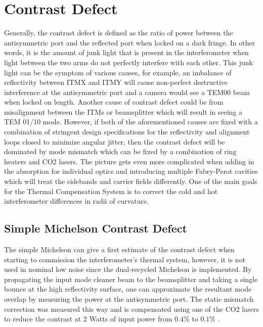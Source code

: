 	\section{Contrast Defect}
	Generally, the contrast defect is defined as the ratio of power between the antisymmetric port and the reflected port when locked on a dark fringe.  In other words, it is the amount of junk light that is present in the interferometer when light between the two arms do not perfectly interfere with each other. This junk light can be the symptom of various causes, for example, an imbalance of reflectivity between ITMX and ITMY will cause non-perfect destructive interference at the antisymmetric port and a camera would see a TEM00 beam when locked on length.  Another cause of contrast defect could be from misalignment between the ITMs or beamsplitter which will result in seeing a TEM 01/10 mode.  However, if both of the aforementioned causes are fixed with a combination of stringent design specifications for the reflectivity and alignment loops closed to minimize angular jitter, then the contrast defect will be dominated by mode mismatch which can be fixed by a combination of ring heaters and CO2 lasers.  The picture gets even more complicated when adding in the absorption for individual optics and introducing multiple Fabry-Perot cavities which will treat the sidebands and carrier fields differently.  One of the main goals for the Thermal Compensation System is to correct the cold and hot interferometer differences in radii of curvature.
	
	\subsection{Simple Michelson Contrast Defect}
	The simple Michelson can give a first estimate of the contrast defect when starting to commission the interferometer's thermal system, however, it is not used in nominal low noise since the dual-recycled Michelson is implemented.  By propagating the input mode cleaner beam to the beamsplitter and taking a single bounce at the high reflectivity surface, one can approximate the resultant mode overlap by measuring the power at the antisymmetric port.  The static mismatch correction was measured this way and is compensated using one of the CO2 lasers to reduce the contrast at 2 Watts of input power from $0.4\%$ to $0.1\%$ \cite{CD_meas}.
	

